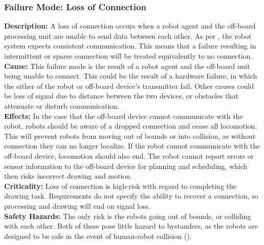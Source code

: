 \subsubsection{Failure Mode: Loss of Connection}
\label{sec:comm_fm_loss}
\textbf{Description:} A loss of connection occurs when a robot agent and the off-board processing unit are unable to send data between each other. As per , the robot system expects consistent communication. This means that a failure resulting in intermittent or sparse connection will be treated equivalently to no connection. \\
\textbf{Cause:} This failure mode is the result of a robot agent and the off-board unit being unable to connect. This could be the result of a hardware failure, in which the either of the robot or off-board device's transmitter fail. Other causes could be loss of signal due to distance between the two devices, or obstacles that attenuate or disturb communication. \\
\textbf{Effects:} In the case that the off-board device cannot communicate with the robot, robots should be aware of a dropped connection and cease all locomotion. This will prevent robots from moving out of bounds or into collision, as without connection they can no longer localize. If the robot cannot communicate with the off-board device, locomotion should also end. The robot cannot report errors or sensor information to the off-board device for planning and scheduling, which then risks incorrect drawing and motion. \\
\textbf{Criticality:} Loss of connection is high-risk with regard to completing the drawing task. Requirements do not specify the ability to recover a connection, so processing and drawing will end on signal loss. \\
\textbf{Safety Hazards:} The only risk is the robots going out of bounds, or colliding with each other. Both of these pose little hazard to bystanders, as the robots are designed to be safe in the event of human-robot collision ().

